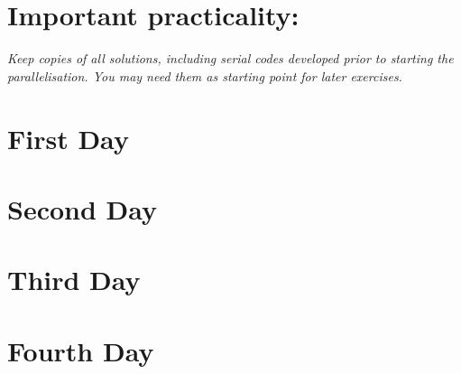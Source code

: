 \documentclass[a4paper,oneside,12pt]{article}
\begin{document}
\section*{Important practicality:}
\textit{Keep copies of all solutions, including serial codes developed prior to starting the parallelisation.  You may need them as starting point for later exercises.}

\pagebreak
\section{First Day}



\pagebreak
\section{Second Day}



\pagebreak
\section{Third Day}



\pagebreak
\section{Fourth Day}


\end{document}
